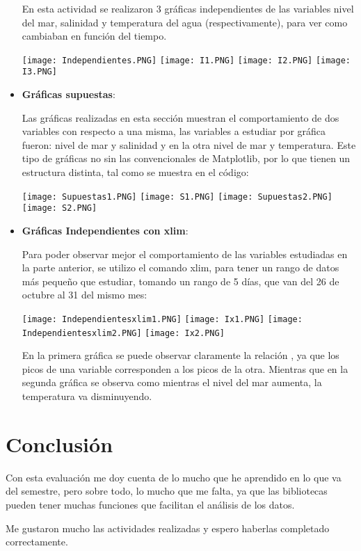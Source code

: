 \documentclass{article}
\begin{document}
\begin{itemize}
En esta actividad se realizaron 3 gráficas independientes de las variables nivel del mar, salinidad y temperatura del agua (respectivamente), para ver como cambiaban en función del tiempo.
\begin{center}
    \texttt{[image: Independientes.PNG]}
    \texttt{[image: I1.PNG]}
    \texttt{[image: I2.PNG]}
    \texttt{[image: I3.PNG]}
\end{center}
\item \textbf{Gráficas supuestas}:


Las gráficas realizadas en esta sección muestran el comportamiento de dos variables con respecto a una misma, las variables a estudiar por gráfica fueron: nivel de mar y salinidad y en la otra nivel de mar y temperatura. Este tipo de gráficas no sin las convencionales de Matplotlib, por lo que tienen un estructura distinta, tal como se muestra en el código:
\begin{center}
    \texttt{[image: Supuestas1.PNG]}
    \texttt{[image: S1.PNG]}
    \texttt{[image: Supuestas2.PNG]}
    \texttt{[image: S2.PNG]}
\end{center}
\item \textbf{Gráficas Independientes con xlim}:


Para poder observar mejor el comportamiento de las variables estudiadas en la parte anterior, se utilizo el comando xlim, para tener un rango de datos más pequeño que estudiar, tomando un rango de 5 días, que van del 26 de octubre al 31 del mismo mes:
\begin{center}
    \texttt{[image: Independientesxlim1.PNG]}
    \texttt{[image: Ix1.PNG]}
    \texttt{[image: Independientesxlim2.PNG]}
    \texttt{[image: Ix2.PNG]}
\end{center}
En la primera gráfica se puede observar claramente la relación , ya que los picos de una variable corresponden a los picos de la otra. Mientras que en la segunda gráfica se observa como mientras el nivel del mar aumenta, la temperatura va disminuyendo.
\end{itemize}

\section{Conclusión}
Con esta evaluación me doy cuenta de lo mucho que he aprendido en lo que va del semestre, pero sobre todo, lo mucho que me falta, ya que las bibliotecas pueden tener muchas funciones que facilitan el análisis de los datos.

Me gustaron mucho las actividades realizadas y espero haberlas completado correctamente.
\end{document}
